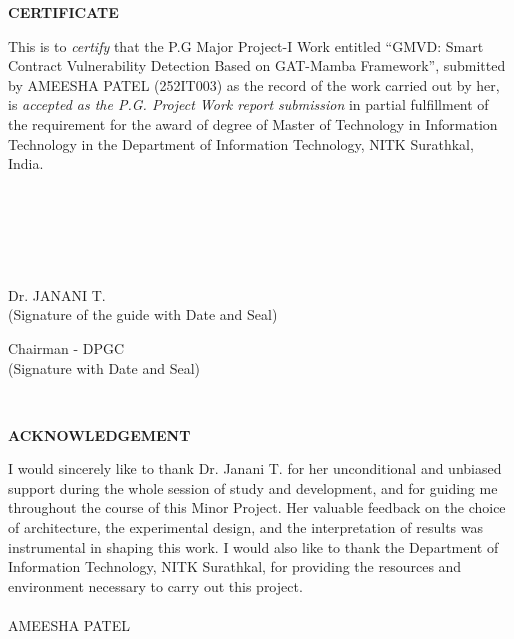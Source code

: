 \documentclass[12pt, a4paper, openright, twoside]{report}
\begin{document}
\begin{framed}
\begin{center}
\textbf{{\Large CERTIFICATE}} \\
\end{center}
\null
This is to \textit{certify} that the P.G Major Project-I Work entitled ``GMVD: Smart Contract Vulnerability Detection Based on GAT-Mamba Framework'',
submitted by AMEESHA PATEL (252IT003) as the record of the work carried out by her, is \textit{accepted as the P.G. Project Work report submission} in partial fulfillment of the requirement for the award of degree of Master of Technology in Information Technology in the Department of Information Technology, NITK Surathkal, India.
\\
\\
\\
\\
\\
\\

\begin{center}
    Dr. JANANI T.\\

    (Signature of the guide with Date and Seal)\\
\null
\null
\null
\null
\null

    Chairman - DPGC\\
    (Signature with Date and Seal)
\end{center}
\end{framed}

\thispagestyle{empty}


\clearpage
\newpage

\ %

\newpage
\thispagestyle{empty}
\begin{center}
\textbf{{\Large ACKNOWLEDGEMENT}}\\
\end{center}
\null
I would sincerely like to thank Dr. Janani T. for her unconditional and unbiased support during the whole session of study and development, and for guiding me throughout the course of this Minor Project. Her valuable feedback on the choice of architecture, the experimental design, and the interpretation of results was instrumental in shaping this work. I would also like to thank the Department of Information Technology, NITK Surathkal, for providing the resources and environment necessary to carry out this project.
\\
\\
\null \hfill AMEESHA PATEL
\\
\clearpage
\cleardoublepage
\end{document}
